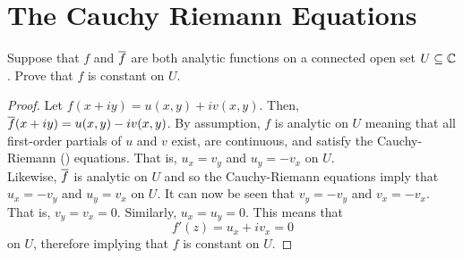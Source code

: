 \setchapterpreamble[u]{\margintoc}
\chapter{The Cauchy Riemann Equations}

\begin{qualproblem}[Fall 2019.C6]
    Suppose that $f$ and $\overline{f}$ are both analytic functions on a connected open set $U \subseteq \mathbb{C}$. Prove that $f$ is constant on $U$.
\end{qualproblem}

\begin{proof}
    Let $f(x+iy) = u(x,y) + iv(x,y)$. Then, $\overline{f}(x + iy) = u(x,y) - iv(x,y)$. By assumption, $f$ is analytic on $U$ meaning that all first-order partials of $u$ and $v$ exist, are continuous, and satisfy the Cauchy-Riemann () equations. That is, $u_x = v_y$ and $u_y = -v_x$ on $U$.\\

    Likewise, $\overline{f}$ is analytic on $U$ and so the Cauchy-Riemann equations imply that $u_x = -v_y$ and $u_y = v_x$ on $U$. It can now be seen that $v_y = -v_y$ and $v_x = -v_x$. That is, $v_y = v_x = 0$. Similarly, $u_x = u_y = 0$. This means that
        \[f'(z) = u_x + iv_x = 0\]
    on $U$, therefore implying  that $f$ is constant on $U$.
\end{proof}